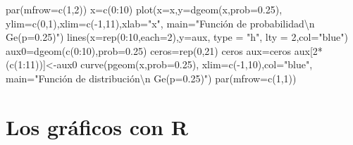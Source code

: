 \documentclass[
  letterpaper,
  DIV=11,
  numbers=noendperiod]{scrreprt}
\newenvironment{Shaded}{\begin{snugshade}}{\end{snugshade}}
\newcommand{\AttributeTok}[1]{\textcolor[rgb]{0.40,0.45,0.13}{#1}}
\newcommand{\DecValTok}[1]{\textcolor[rgb]{0.68,0.00,0.00}{#1}}
\newcommand{\FloatTok}[1]{\textcolor[rgb]{0.68,0.00,0.00}{#1}}
\newcommand{\FunctionTok}[1]{\textcolor[rgb]{0.28,0.35,0.67}{#1}}
\newcommand{\NormalTok}[1]{\textcolor[rgb]{0.00,0.23,0.31}{#1}}
\newcommand{\OtherTok}[1]{\textcolor[rgb]{0.00,0.23,0.31}{#1}}
\newcommand{\SpecialCharTok}[1]{\textcolor[rgb]{0.37,0.37,0.37}{#1}}
\newcommand{\StringTok}[1]{\textcolor[rgb]{0.13,0.47,0.30}{#1}}
\begin{document}
\begin{Shaded}
\begin{Highlighting}[]
\FunctionTok{par}\NormalTok{(}\AttributeTok{mfrow=}\FunctionTok{c}\NormalTok{(}\DecValTok{1}\NormalTok{,}\DecValTok{2}\NormalTok{))}
\NormalTok{x}\OtherTok{=}\FunctionTok{c}\NormalTok{(}\DecValTok{0}\SpecialCharTok{:}\DecValTok{10}\NormalTok{)}
\FunctionTok{plot}\NormalTok{(}\AttributeTok{x=}\NormalTok{x,}\AttributeTok{y=}\FunctionTok{dgeom}\NormalTok{(x,}\AttributeTok{prob=}\FloatTok{0.25}\NormalTok{),}
  \AttributeTok{ylim=}\FunctionTok{c}\NormalTok{(}\DecValTok{0}\NormalTok{,}\DecValTok{1}\NormalTok{),}\AttributeTok{xlim=}\FunctionTok{c}\NormalTok{(}\SpecialCharTok{{-}}\DecValTok{1}\NormalTok{,}\DecValTok{11}\NormalTok{),}\AttributeTok{xlab=}\StringTok{"x"}\NormalTok{,}
  \AttributeTok{main=}\StringTok{"Función de probabilidad}\SpecialCharTok{\textbackslash{}n}\StringTok{ Ge(p=0.25)"}\NormalTok{)}
\FunctionTok{lines}\NormalTok{(}\AttributeTok{x=}\FunctionTok{rep}\NormalTok{(}\DecValTok{0}\SpecialCharTok{:}\DecValTok{10}\NormalTok{,}\AttributeTok{each=}\DecValTok{2}\NormalTok{),}\AttributeTok{y=}\NormalTok{aux, }\AttributeTok{type =} \StringTok{"h"}\NormalTok{, }\AttributeTok{lty =} \DecValTok{2}\NormalTok{,}\AttributeTok{col=}\StringTok{"blue"}\NormalTok{)}
\NormalTok{aux0}\OtherTok{=}\FunctionTok{dgeom}\NormalTok{(}\FunctionTok{c}\NormalTok{(}\DecValTok{0}\SpecialCharTok{:}\DecValTok{10}\NormalTok{),}\AttributeTok{prob=}\FloatTok{0.25}\NormalTok{)}
\NormalTok{ceros}\OtherTok{=}\FunctionTok{rep}\NormalTok{(}\DecValTok{0}\NormalTok{,}\DecValTok{21}\NormalTok{)}
\NormalTok{ceros}
\NormalTok{aux}\OtherTok{=}\NormalTok{ceros}
\NormalTok{aux[}\DecValTok{2}\SpecialCharTok{*}\NormalTok{(}\FunctionTok{c}\NormalTok{(}\DecValTok{1}\SpecialCharTok{:}\DecValTok{11}\NormalTok{))]}\OtherTok{\textless{}{-}}\NormalTok{aux0}
\FunctionTok{curve}\NormalTok{(}\FunctionTok{pgeom}\NormalTok{(x,}\AttributeTok{prob=}\FloatTok{0.25}\NormalTok{),}
  \AttributeTok{xlim=}\FunctionTok{c}\NormalTok{(}\SpecialCharTok{{-}}\DecValTok{1}\NormalTok{,}\DecValTok{10}\NormalTok{),}\AttributeTok{col=}\StringTok{"blue"}\NormalTok{,}
  \AttributeTok{main=}\StringTok{"Función de distribución}\SpecialCharTok{\textbackslash{}n}\StringTok{ Ge(p=0.25)"}\NormalTok{)}
\FunctionTok{par}\NormalTok{(}\AttributeTok{mfrow=}\FunctionTok{c}\NormalTok{(}\DecValTok{1}\NormalTok{,}\DecValTok{1}\NormalTok{))}
\end{Highlighting}
\end{Shaded}

\section{Los gráficos con R}\label{los-gruxe1ficos-con-r}
\end{document}
